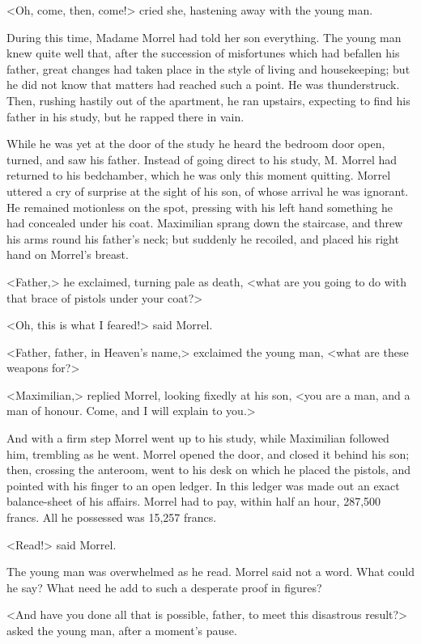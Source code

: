 <Oh, come, then, come!> cried she, hastening away with the young man. 

 During this time, Madame Morrel had told her son everything. The young man knew quite well that, after the succession of misfortunes which had befallen his father, great changes had taken place in the style of living and housekeeping; but he did not know that matters had reached such a point. He was thunderstruck. Then, rushing hastily out of the apartment, he ran upstairs, expecting to find his father in his study, but he rapped there in vain. 

 While he was yet at the door of the study he heard the bedroom door open, turned, and saw his father. Instead of going direct to his study, M. Morrel had returned to his bedchamber, which he was only this moment quitting. Morrel uttered a cry of surprise at the sight of his son, of whose arrival he was ignorant. He remained motionless on the spot, pressing with his left hand something he had concealed under his coat. Maximilian sprang down the staircase, and threw his arms round his father's neck; but suddenly he recoiled, and placed his right hand on Morrel's breast. 

 <Father,> he exclaimed, turning pale as death, <what are you going to do with that brace of pistols under your coat?> 

 <Oh, this is what I feared!> said Morrel. 

 <Father, father, in Heaven's name,> exclaimed the young man, <what are these weapons for?> 

 <Maximilian,> replied Morrel, looking fixedly at his son, <you are a man, and a man of honour. Come, and I will explain to you.> 

 And with a firm step Morrel went up to his study, while Maximilian followed him, trembling as he went. Morrel opened the door, and closed it behind his son; then, crossing the anteroom, went to his desk on which he placed the pistols, and pointed with his finger to an open ledger. In this ledger was made out an exact balance-sheet of his affairs. Morrel had to pay, within half an hour, 287,500 francs. All he possessed was 15,257 francs. 

 <Read!> said Morrel. 

 The young man was overwhelmed as he read. Morrel said not a word. What could he say? What need he add to such a desperate proof in figures? 

 <And have you done all that is possible, father, to meet this disastrous result?> asked the young man, after a moment's pause. 

